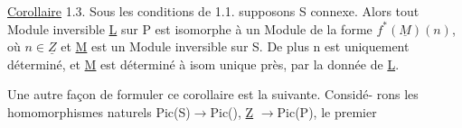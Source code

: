 \uline{Corollaire} 1.3. Sous les conditions de 1.1. supposons S connexe. Alors
tout Module inversible \underline{L} sur P est isomorphe à un Module de la forme
$f^*(\underline{M})(n)$, où $n\in\underline{Z}$ et \underline{M} est un Module inversible sur S. De plus n est
uniquement déterminé, et \underline{M} est déterminé à isom unique près, par la donnée
de \underline{L}.

Une autre façon de formuler ce corollaire est la suivante. Considé-%
rons les homomorphismes naturels Pic(S)$\longrightarrow$Pic(), \underline{Z} $\longrightarrow$Pic(P), le premier

